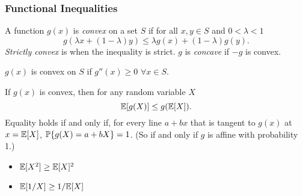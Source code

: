\subsubsection{Functional Inequalities}

\begin{definition}
    A function $g(x)$ is \emph{convex} on a set $S$ if for all $x, y \in S$ and $0< \lambda < 1$
    \[
        g(\lambda x + (1 - \lambda)y) \leq \lambda g(x) + (1 - \lambda)g(y).
    \]
    \emph{Strictly convex} is when the inequality is strict. $g$ is \emph{concave} if $-g$ is convex.
\end{definition}

\begin{lemma}
    $g(x)$ is convex on $S$ if $g''(x) \geq 0$ $\forall x \in S$.
\end{lemma}

\begin{theorem}
    If $g(x)$ is convex, then for any random variable $X$
    \[
        \E{}[g(X)] \leq g(\E{}[X]).
    \]
    Equality holds if and only if, for every line $a + bx$ that is tangent to $g(x)$ at $x = \E{}[X]$, $\P{}\{g(X) = a + bX\} = 1$. (So if and only if $g$ is affine with probability 1.)
\end{theorem}

\begin{corollary}
    \mbox{}
    \begin{itemize}
        \item $\E{}[X^2] \geq \E{}[X]^2$
        \item $\E{}[1/X] \geq 1/ \E{}[X]$
    \end{itemize}
\end{corollary}









